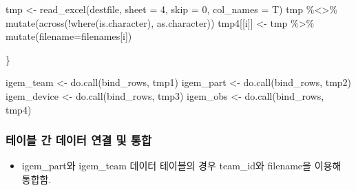 \documentclass[
]{article}
\newenvironment{Shaded}{\begin{snugshade}}{\end{snugshade}}
\newcommand{\AttributeTok}[1]{\textcolor[rgb]{0.77,0.63,0.00}{#1}}
\newcommand{\DecValTok}[1]{\textcolor[rgb]{0.00,0.00,0.81}{#1}}
\newcommand{\FunctionTok}[1]{\textcolor[rgb]{0.00,0.00,0.00}{#1}}
\newcommand{\NormalTok}[1]{#1}
\newcommand{\OtherTok}[1]{\textcolor[rgb]{0.56,0.35,0.01}{#1}}
\newcommand{\SpecialCharTok}[1]{\textcolor[rgb]{0.00,0.00,0.00}{#1}}
\providecommand{\tightlist}{%
  \setlength{\itemsep}{0pt}\setlength{\parskip}{0pt}}
\begin{document}
\begin{Shaded}
\begin{Highlighting}[]
\NormalTok{  tmp }\OtherTok{\textless{}{-}} \FunctionTok{read\_excel}\NormalTok{(destfile, }\AttributeTok{sheet =} \DecValTok{4}\NormalTok{, }\AttributeTok{skip =} \DecValTok{0}\NormalTok{, }\AttributeTok{col\_names =}\NormalTok{ T) }
\NormalTok{  tmp }\SpecialCharTok{\%\textless{}\textgreater{}\%} \FunctionTok{mutate}\NormalTok{(}\FunctionTok{across}\NormalTok{(}\SpecialCharTok{!}\FunctionTok{where}\NormalTok{(is.character), as.character)) }
\NormalTok{  tmp4[[i]] }\OtherTok{\textless{}{-}}\NormalTok{ tmp }\SpecialCharTok{\%\textgreater{}\%} \FunctionTok{mutate}\NormalTok{(}\AttributeTok{filename=}\NormalTok{filenames[i])}
  
\NormalTok{\}}

\NormalTok{igem\_team }\OtherTok{\textless{}{-}} \FunctionTok{do.call}\NormalTok{(bind\_rows, tmp1)}
\NormalTok{igem\_part }\OtherTok{\textless{}{-}} \FunctionTok{do.call}\NormalTok{(bind\_rows, tmp2)}
\NormalTok{igem\_device }\OtherTok{\textless{}{-}} \FunctionTok{do.call}\NormalTok{(bind\_rows, tmp3)}
\NormalTok{igem\_obs }\OtherTok{\textless{}{-}} \FunctionTok{do.call}\NormalTok{(bind\_rows, tmp4)}
\end{Highlighting}
\end{Shaded}

\hypertarget{uxd14cuxc774uxbe14-uxac04-uxb370uxc774uxd130-uxc5f0uxacb0-uxbc0f-uxd1b5uxd569}{%
\subsubsection{테이블 간 데이터 연결 및
통합}\label{uxd14cuxc774uxbe14-uxac04-uxb370uxc774uxd130-uxc5f0uxacb0-uxbc0f-uxd1b5uxd569}}

\begin{itemize}
\tightlist
\item
  igem\_part와 igem\_team 데이터 테이블의 경우 team\_id와 filename을
  이용해 통합함.
\end{itemize}
\end{document}
